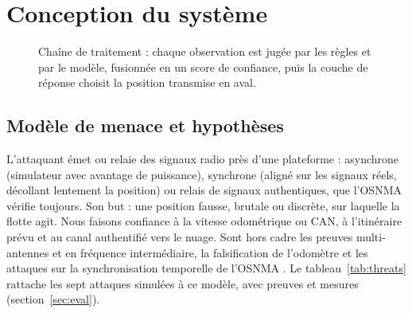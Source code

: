 \documentclass[conference]{IEEEtran}
\begin{document}
\section{Conception du système}\label{sec:design}

\begin{figure}[t]
\centering
{}
\caption{Chaîne de traitement : chaque observation est jugée par les règles et par le modèle, fusionnée en un score de confiance, puis la couche de réponse choisit la position transmise en aval.}
\label{fig:pipeline}
\end{figure}

\subsection{Modèle de menace et hypothèses}
L'attaquant émet ou relaie des signaux radio près d'une plateforme : asynchrone (simulateur avec avantage de puissance), synchrone (aligné sur les signaux réels, décollant lentement la position) ou relais de signaux authentiques, que l'OSNMA vérifie toujours. Son but : une position fausse, brutale ou discrète, sur laquelle la flotte agit. Nous faisons confiance à la vitesse odométrique ou CAN, à l'itinéraire prévu et au canal authentifié vers le nuage. Sont hors cadre les preuves multi-antennes et en fréquence intermédiaire, la falsification de l'odomètre et les attaques sur la synchronisation temporelle de l'OSNMA \cite{wang2025}. Le tableau~\ref{tab:threats} rattache les sept attaques simulées à ce modèle, avec preuves et mesures (section~\ref{sec:eval}).
\end{document}
